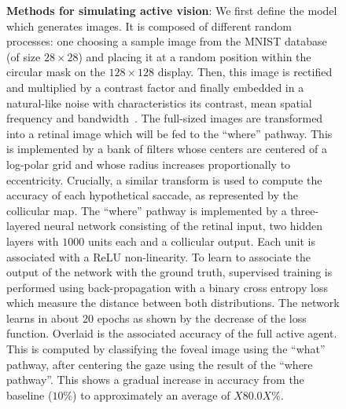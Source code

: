 \begin{figure}[t!]%
\caption{
{\bf Methods for simulating active vision}:
\A We first define the model which generates images. It is composed of different random processes: one choosing a sample image from the MNIST database (of size $28\times 28$) and placing it at a random position within the circular mask on the $128\times 128$ display. Then, this image is rectified and multiplied by a contrast factor and finally embedded in a natural-like noise with characteristics its contrast, mean spatial frequency and bandwidth~\citep{Sanz12}. %
\B The full-sized images are transformed into a retinal image which will be fed to the ``where'' pathway. This is implemented by a bank of filters whose centers are centered of a log-polar grid and whose radius increases proportionally to eccentricity. Crucially, a similar transform is used to compute the accuracy of each hypothetical saccade, as represented by the collicular map. %
\C The ``where'' pathway is implemented by a three-layered neural network consisting of the retinal input, two hidden layers with $1000$ units each and a collicular output. Each unit is associated with a ReLU non-linearity. To learn to associate the output of the network with the ground truth, supervised training is performed using back-propagation with a binary cross entropy loss which measure the distance between both distributions. The network learns in about 20 epochs as shown by the decrease of the loss function. Overlaid is the associated accuracy of the full active agent. This is computed by classifying the foveal image using the ``what'' pathway, after centering the gaze using the result of the ``where pathway''. This shows a gradual increase in accuracy from the baseline ($10\%$) to approximately an average of $X80.0X\%$. %
}%
\end{figure}%

